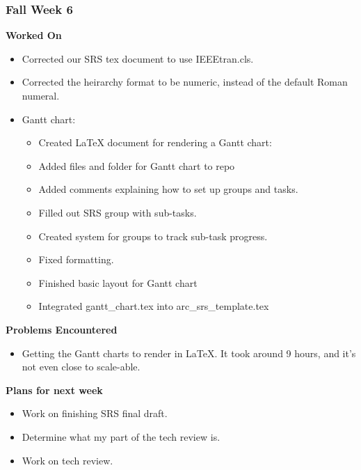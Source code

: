 \documentclass[compsoc,draftclsnofoot,onecolumn,10pt]{IEEEtran}
\begin{document}
\subsubsection*{Fall Week 6}
\textbf{Worked On}
\begin{itemize}
    \item Corrected our SRS tex document to use IEEEtran.cls.
    \item Corrected the heirarchy format to be numeric, instead of the default Roman numeral.
    \item Gantt chart:
    \begin{itemize}
        \item Created LaTeX document for rendering a Gantt chart:
        \item Added files and folder for Gantt chart to repo
        \item Added comments explaining how to set up groups and tasks.
        \item Filled out SRS group with sub-tasks.
        \item Created system for groups to track sub-task progress.
        \item Fixed formatting.
        \item Finished basic layout for Gantt chart
        \item Integrated gantt\_chart.tex into arc\_srs\_template.tex
    \end{itemize}
\end{itemize}
\textbf{Problems Encountered}
\begin{itemize}
    \item Getting the Gantt charts to render in LaTeX. It took around 9 hours, and it's not even close to scale-able.
\end{itemize}
\textbf{Plans for next week}
\begin{itemize}
    \item Work on finishing SRS final draft.
    \item Determine what my part of the tech review is.
    \item Work on tech review.
\end{itemize}
\end{document}
